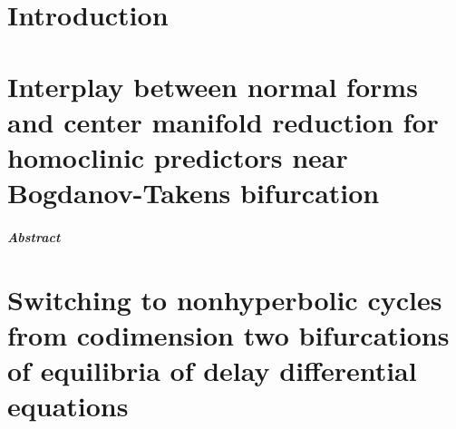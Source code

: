 \documentclass[twoside]{report}
\begin{document}
\newif\ifsiam
\siamfalse
\siamtrue

\newif\ifarxiv
\arxivtrue
\arxivfalse

\newif\ifcompileimages%
\compileimagestrue%
\compileimagesfalse%



\newif\ifthesis
\thesistrue

{\hypersetup{linkcolor=siamblue} \tableofcontents }

\chapter{Introduction}


\chapter[BT normal forms and center manifold reduction]
        {Interplay between normal forms and center manifold reduction for homoclinic predictors near Bogdanov-Takens bifurcation}
\label{chapter:interplay}
\newcommand\imagesdir{./images/btinterplay}
\newcommand\datadir{./data/btinterplay}
\paragraph{{\color{header1}Abstract}}








\begin{subappendices}




\end{subappendices}

\renewcommand\tikzdir{tikz/switching}
\renewcommand\imagedir{images/switching}
\chapter[Switching to nonhyperbolic cycles in DDEs]
        {Switching to nonhyperbolic cycles from codimension two bifurcations of equilibria of delay differential equations}
\label{chapter:switching}

\end{document}
